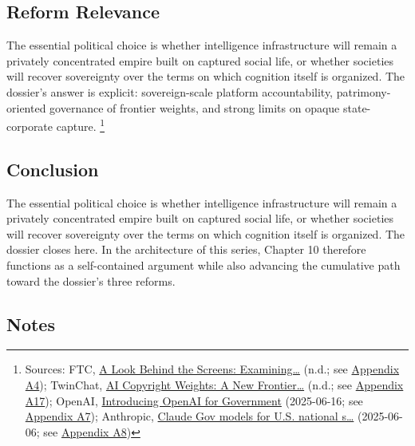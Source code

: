 \documentclass[
  american,
  11pt,
  letterpaper,
]{article}
\begin{document}
\subsection{Reform Relevance}\label{reform-relevance}

The essential political choice is whether intelligence infrastructure
will remain a privately concentrated empire built on captured social
life, or whether societies will recover sovereignty over the terms on
which cognition itself is organized. The dossier's answer is explicit:
sovereign-scale platform accountability, patrimony-oriented governance
of frontier weights, and strong limits on opaque state-corporate
capture. \footnote{Sources: FTC,
  \href{https://www.ftc.gov/reports/look-behind-screens-examining-data-practices-social-media-video-streaming-services}{A
  Look Behind the Screens: Examining\ldots{}} (n.d.; see
  \hyperref[appendix-a4-a-look-behind-the-screens-examining-the-data-practices-of-social-media-and-video-streaming-services]{Appendix
  A4}); TwinChat,
  \href{https://medium.com/twinchat/ai-copyright-weights-a-new-frontier-in-intellectual-property-law-d8ee1b6c55ee}{AI
  Copyright Weights: A New Frontier\ldots{}} (n.d.; see
  \hyperref[appendix-a17-ai-copyright-weights-a-new-frontier-in-intellectual-property-law]{Appendix
  A17}); OpenAI,
  \href{https://openai.com/global-affairs/introducing-openai-for-government/}{Introducing
  OpenAI for Government} (2025-06-16; see
  \hyperref[appendix-a7-introducing-openai-for-government]{Appendix
  A7}); Anthropic,
  \href{https://www.anthropic.com/news/claude-gov-models-for-u-s-national-security-customers}{Claude
  Gov models for U.S. national s\ldots{}} (2025-06-06; see
  \hyperref[appendix-a8-claude-gov-models-for-u-s-national-security-customers]{Appendix
  A8})}

\subsection{Conclusion}\label{conclusion}

The essential political choice is whether intelligence infrastructure
will remain a privately concentrated empire built on captured social
life, or whether societies will recover sovereignty over the terms on
which cognition itself is organized. The dossier closes here. In the
architecture of this series, Chapter 10 therefore functions as a
self-contained argument while also advancing the cumulative path toward
the dossier's three reforms.

\subsection{Notes}\label{notes}
\end{document}
